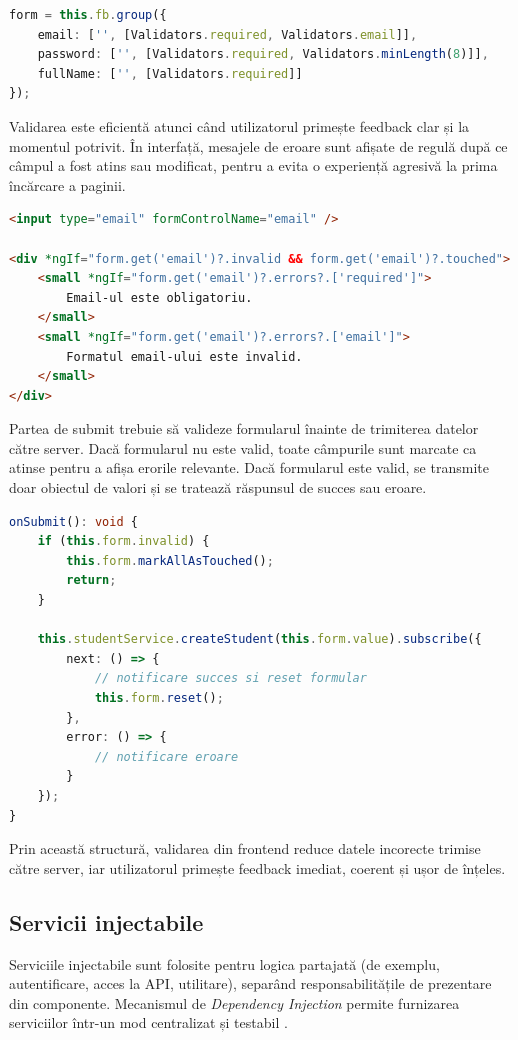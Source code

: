 \begin{lstlisting}[language=TypeScript]
form = this.fb.group({
	email: ['', [Validators.required, Validators.email]],
	password: ['', [Validators.required, Validators.minLength(8)]],
	fullName: ['', [Validators.required]]
});
\end{lstlisting}

Validarea este eficientă atunci când utilizatorul primește feedback clar și la momentul potrivit. În interfață, mesajele de eroare sunt afișate de regulă după ce câmpul a fost atins sau modificat, pentru a evita o experiență agresivă la prima încărcare a paginii.

\begin{lstlisting}[language=HTML]
<input type="email" formControlName="email" />

<div *ngIf="form.get('email')?.invalid && form.get('email')?.touched">
	<small *ngIf="form.get('email')?.errors?.['required']">
		Email-ul este obligatoriu.
	</small>
	<small *ngIf="form.get('email')?.errors?.['email']">
		Formatul email-ului este invalid.
	</small>
</div>
\end{lstlisting}

Partea de submit trebuie să valideze formularul înainte de trimiterea datelor către server. Dacă formularul nu este valid, toate câmpurile sunt marcate ca atinse pentru a afișa erorile relevante. Dacă formularul este valid, se transmite doar obiectul de valori și se tratează răspunsul de succes sau eroare.

\begin{lstlisting}[language=TypeScript]
onSubmit(): void {
	if (this.form.invalid) {
		this.form.markAllAsTouched();
		return;
	}

	this.studentService.createStudent(this.form.value).subscribe({
		next: () => {
			// notificare succes si reset formular
			this.form.reset();
		},
		error: () => {
			// notificare eroare
		}
	});
}
\end{lstlisting}

Prin această structură, validarea din frontend reduce datele incorecte trimise către server, iar utilizatorul primește feedback imediat, coerent și ușor de înțeles.

\subsection{Servicii injectabile}
Serviciile injectabile sunt folosite pentru logica partajată (de exemplu, autentificare, acces la API, utilitare), separând responsabilitățile de prezentare din componente. Mecanismul de \textit{Dependency Injection} permite furnizarea serviciilor într-un mod centralizat și testabil \cite{google_angular_2024}.


